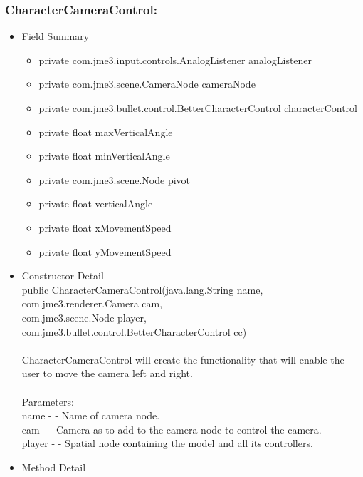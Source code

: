 \documentclass[letterpaper]{article}
\begin{document}
				\subsubsection*{CharacterCameraControl:}
				\vspace{0.1in}
					\begin{itemize}
						\item	Field Summary
								\begin{itemize}
									\item	private com.jme3.input.controls.AnalogListener	analogListener 
									\item	private com.jme3.scene.CameraNode	cameraNode 
									\item	private com.jme3.bullet.control.BetterCharacterControl	characterControl 
									\item	private float	maxVerticalAngle 
									\item	private float	minVerticalAngle 
									\item	private com.jme3.scene.Node	pivot 
									\item	private float	verticalAngle 
									\item	private float	xMovementSpeed 
									\item	private float	yMovementSpeed
								\end{itemize}
						\item	Constructor Detail \\
								public CharacterCameraControl(java.lang.String name, \\
                     com.jme3.renderer.Camera cam, \\
                     com.jme3.scene.Node player, \\
                     com.jme3.bullet.control.BetterCharacterControl cc) \\ \\
								CharacterCameraControl will create the functionality that will enable the user to move the camera left and right. \\ \\
								Parameters: \\
								name - - Name of camera node. \\
								cam - - Camera as to add to the camera node to control the camera. \\
								player - - Spatial node containing the model and all its controllers.
						\item	Method Detail

\end{itemize}
\end{document}
